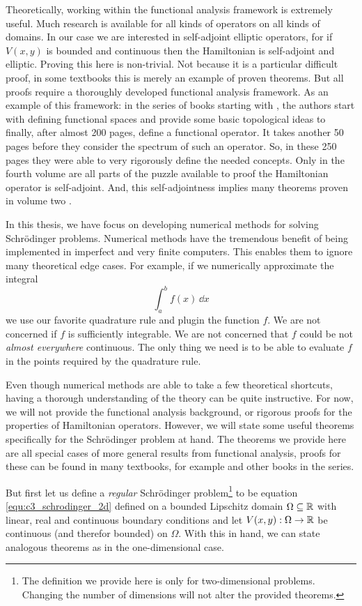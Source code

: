 Theoretically, working within the functional analysis framework is extremely useful. Much research is available for all kinds of operators on all kinds of domains. In our case we are interested in self-adjoint elliptic operators, for if $V(x, y)$ is bounded and continuous then the Hamiltonian is self-adjoint and elliptic. Proving this here is non-trivial. Not because it is a particular difficult proof, in some textbooks this is merely an example of proven theorems. But all proofs require a thoroughly developed functional analysis framework. As an example of this framework: in the series of books starting with \cite{reed_functional_1980}, the authors start with defining functional spaces and provide some basic topological ideas to finally, after almost 200 pages, define a functional operator. It takes another 50 pages before they consider the spectrum of such an operator. So, in these 250 pages they were able to very rigorously define the needed concepts. Only in the fourth volume \cite{reed_iv_1978} are all parts of the puzzle available to proof the Hamiltonian operator is self-adjoint. And, this self-adjointness implies many theorems proven in volume two \cite{reed_ii_1975}.

In this thesis, we have focus on developing numerical methods for solving Schrödinger problems. Numerical methods have the tremendous benefit of being implemented in imperfect and very finite computers. This enables them to ignore many theoretical edge cases. For example, if we numerically approximate the integral
$$
    \int_a^b f(x)\,\dd x
$$
we use our favorite quadrature rule and plugin the function $f$. We are not concerned if $f$ is sufficiently integrable. We are not concerned that $f$ could be not \emph{almost everywhere} continuous. The only thing we need is to be able to evaluate $f$ in the points required by the quadrature rule.

Even though numerical methods are able to take a few theoretical shortcuts, having a thorough understanding of the theory can be quite instructive. For now, we will not provide the functional analysis background, or rigorous proofs for the properties of Hamiltonian operators. However, we will state some useful theorems specifically for the Schrödinger problem at hand. The theorems we provide here are all special cases of more general results from functional analysis, proofs for these can be found in many textbooks, for example \cite{reed_functional_1980} and other books in the series.

But first let us define a \emph{regular} Schrödinger problem\footnote{The definition we provide here is only for two-dimensional problems. Changing the number of dimensions will not alter the provided theorems.} to be equation \ref{equ:c3_schrodinger_2d} defined on a bounded Lipschitz domain $\Omega \subseteq \mathbb{R}$ with linear, real and continuous boundary conditions and let $V(x, y) : \Omega \to \mathbb{R}$ be continuous (and therefor bounded) on $\Omega$. With this in hand, we can state analogous theorems as in the one-dimensional case.

